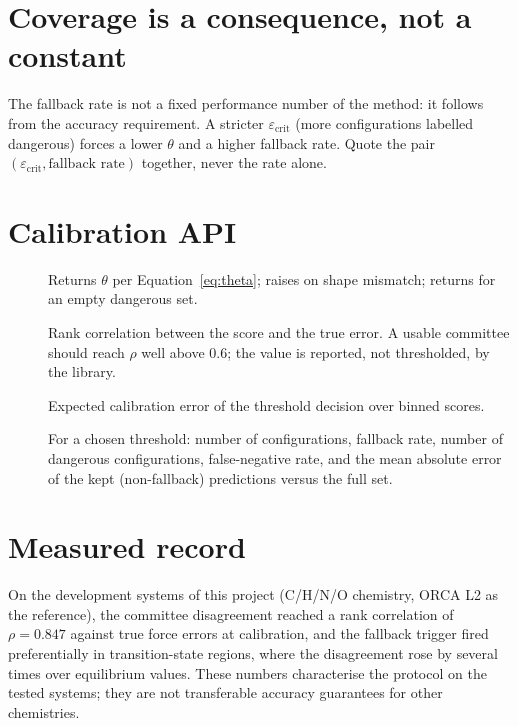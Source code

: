 \section{Coverage is a consequence, not a constant}

The fallback rate is not a fixed performance number of the method: it
follows from the accuracy requirement.  A stricter
$\varepsilon_{\mathrm{crit}}$ (more configurations labelled dangerous) forces
a lower $\theta$ and a higher fallback rate.  Quote the pair
$(\varepsilon_{\mathrm{crit}}, \text{fallback rate})$ together, never the
rate alone.

\section{Calibration API}

\begin{description}
  \item[]
    Returns $\theta$ per Equation~\ref{eq:theta}; raises 
    on shape mismatch; returns  for an empty dangerous set.
  \item[]
    Rank correlation between the score and the true error.  A usable
    committee should reach $\rho$ well above $0.6$; the value is reported,
    not thresholded, by the library.
  \item[]
    Expected calibration error of the threshold decision over binned scores.
  \item[]
    For a chosen threshold: number of configurations, fallback rate,
    number of dangerous configurations, false-negative rate, and the mean
    absolute error of the kept (non-fallback) predictions versus the full
    set.
\end{description}

\section{Measured record}

On the development systems of this project (C/H/N/O chemistry, ORCA L2 as
the reference), the committee disagreement reached a rank correlation of
$\rho = 0.847$ against true force errors at calibration, and the fallback
trigger fired preferentially in transition-state regions, where the
disagreement rose by several times over equilibrium values.  These numbers
characterise the protocol on the tested systems; they are not transferable
accuracy guarantees for other chemistries.

